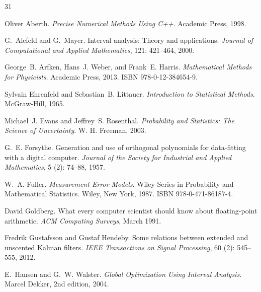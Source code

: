 \documentclass[twoside]{article}
\numberwithin{equation}{section}
\begin{document}
\begin{thebibliography}{31}
\iffalse
\providecommand{\natexlab}[1]{#1}
\providecommand{\url}[1]{\texttt{#1}}
\expandafter\ifx\csname urlstyle\endcsname\relax
  \providecommand{\doi}[1]{doi: #1}\else
  \providecommand{\doi}{doi: \begingroup \urlstyle{rm}\Url}\fi
\fi

Oliver Aberth.
\newblock \emph{Precise Numerical Methods Using {C++}}.
\newblock Academic Press, 1998.

G.~Alefeld and G.~Mayer.
\newblock Interval analysis: Theory and applications.
\newblock \emph{Journal of Computational and Applied Mathematics},
  121: 421--464, 2000.

George~B. Arfken, Hans~J. Weber, and Frank~E. Harris.
\newblock \emph{Mathematical Methods for Physicists}.
\newblock Academic Press, 2013.
\newblock ISBN 978-0-12-384654-9.

Sylvain Ehrenfeld and Sebastian~B. Littauer.
\newblock \emph{Introduction to Statistical Methods}.
\newblock McGraw-Hill, 1965.

Michael~J. Evans and Jeffrey~S. Rosenthal.
\newblock \emph{Probability and Statistics: The Science of Uncertainty}.
\newblock W. H. Freeman, 2003.

G.~E. Forsythe.
\newblock Generation and use of orthogonal polynomials for data-fitting with a
  digital computer.
\newblock \emph{Journal of the Society for Industrial and Applied Mathematics},
  5 (2): 74--88, 1957.

W.~A. Fuller.
\newblock \emph{Measurement Error Models}.
\newblock Wiley Series in Probability and Mathematical Statistics. Wiley, New
  York, 1987.
\newblock ISBN 978-0-471-86187-4.

David Goldberg.
\newblock What every computer scientist should know about floating-point
  arithmetic.
\newblock \emph{ACM Computing Surveys}, March 1991.

Fredrik Gustafsson and Gustaf Hendeby.
\newblock Some relations between extended and unscented {Kalman} filters.
\newblock \emph{IEEE Transactions on Signal Processing}, 60
  (2): 545--555, 2012.

E.~Hansen and G.~W. Walster.
\newblock \emph{Global Optimization Using Interval Analysis}.
\newblock Marcel Dekker, 2nd edition, 2004.


\end{thebibliography}
\end{document}
